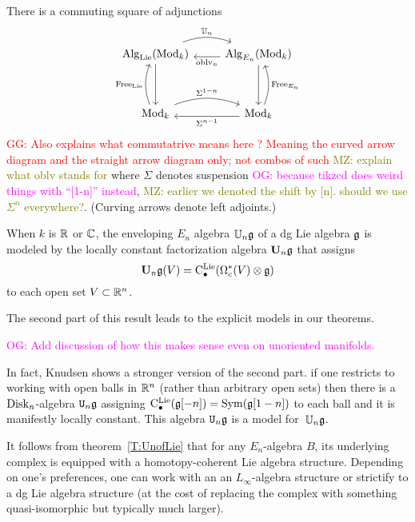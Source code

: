 \documentclass[11pt]{amsart}
\numberwithin{equation}{section}
\def\owen{\textcolor{magenta}{OG: }\textcolor{magenta}}
\def\mahmoud{\textcolor{olive}{MZ: }\textcolor{olive}}
\def\greg{\textcolor{red}{GG: }\textcolor{red}}
\begin{document}
\begin{thm}\label{T:UnofLie}
There is a commuting square of adjunctions
\[
\begin{tikzcd}
\Alg_\Lie(\Mod_k) \arrow[r, bend left=20, shift left=.5ex,"\UU_n"] \arrow[dd] & \Alg_{E_n}(\Mod_k) \arrow[l, shift left=.5ex, "\oblv_n"] \arrow[dd]\\
&\\
\Mod_k \arrow[r, bend left=20, shift left=.5ex, "\Sigma^{1-n}"] \arrow[uu, bend left=20, shift left=.5ex, "\Free_\Lie"] & \Mod_k \arrow[l, shift left=.5ex,"\Sigma^{n-1}"] \arrow[uu, bend right=20, shift right=.5ex, "\Free_{E_n}"']
\end{tikzcd}
\]
\greg{Also explains what commutatrive means here ? Meaning the curved arrow diagram and the straight arrow diagram only; not combos of such}
\mahmoud{explain what oblv stands for}
where $\Sigma$ denotes suspension \owen{because tikzcd does weird things with ``[1-n]'' instead}, \mahmoud{earlier we denoted the shift by [n]. should we use $\Sigma^n$ everywhere?}.
(Curving arrows denote left adjoints.)

When $k$ is $\mathbb R$ or $\mathbb C$, 
the enveloping $E_n$ algebra $\mathbb U_n \mathfrak g$ of a dg Lie algebra $\mathfrak g$ is modeled by the locally constant factorization algebra $\mathbf U_n \mathfrak g$ that assigns
\[
\mathbf U_n \mathfrak g(V) = {\rm C}^{\rm Lie}_\bullet(\Omega^*_c(V) \otimes \mathfrak g)
\]
to each open set $V \subset \mathbb R^n$.
\end{thm}

The second part of this result leads to the explicit models in our theorems.

\owen{Add discussion of how this makes sense even on unoriented manifolds.}

In fact, Knudsen shows a stronger version of the second part.
if one restricts to working with open balls in $\mathbb R^n$ (rather than arbitrary open sets)
then there is a ${\rm Disk}_n$-algebra ${\tt U}_n \mathfrak g$ assigning ${\rm C}^{\rm Lie}_\bullet(\mathfrak g[-n]) = {\rm Sym}(\mathfrak g[1-n])$ to each ball and it is manifestly locally constant.
This algebra ${\tt U}_n \mathfrak g$ is a model for~$\mathbb U_n \mathfrak g$.

\begin{rmk}
It follows from theorem~\ref{T:UnofLie} that for any $E_n$-algebra $B$, 
its underlying complex is equipped with a homotopy-coherent Lie algebra structure.
Depending on one's preferences, one can work with an an $L_\infty$-algebra structure or strictify to a dg Lie algebra structure (at the cost of replacing the complex with something quasi-isomorphic but typically much larger).
\end{rmk}
\end{document}
